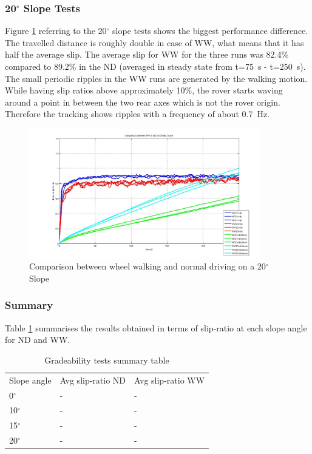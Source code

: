 \documentclass[a4paper,twocolumn]{esapub2005} %
\begin{document}
\subsubsection*{20$^{\circ}$ Slope Tests}
Figure \ref{fig:20d} referring to the 20$^\circ$ slope tests shows the biggest
performance difference. The travelled distance is roughly double in case of WW,
what means that it has half the average slip. The average slip for WW for the
three runs was 82.4\% compared to 89.2\% in the ND (averaged in steady state
from t=75~\unit{s} - t=250~\unit{s}).  The small periodic ripples in the WW
runs are generated by the walking motion. While having slip ratios above
approximately 10\%, the rover starts waving around a point in between the two
rear axes which is not the rover origin. Therefore the tracking shows ripples
with a frequency of about 0.7~\unit{Hz}.

\begin{figure}[h!]
    \centering
    \includegraphics[width=0.9\textwidth]{20d.jpg}	\caption{Comparison between
    wheel walking and normal driving on a 20$^{\circ}$ Slope} \label{fig:20d}
\end{figure}

\subsubsection*{Summary}
Table \ref{tab:SlopeSummaryTable} summarises the results obtained in terms of slip-ratio at each slope angle for ND and WW.

\begin{table}[h]
	\begin{tabular}{lll}
	Slope angle & Avg slip-ratio ND & Avg slip-ratio WW \\
	0$^{\circ}$       & -                 & -                 \\
	10$^{\circ}$      & -                 & -                 \\
	15$^{\circ}$      & -                 & -                 \\
	20$^{\circ}$      & -                 & -                
	\end{tabular}
	\caption{Gradeability tests summary table}
	\label{tab:SlopeSummaryTable}
\end{table}
\end{document}

